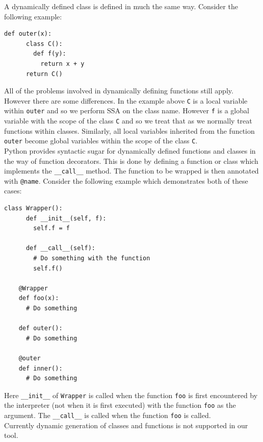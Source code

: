\documentclass[12pt, titlepage]{article}
\begin{document}
\indent A dynamically defined class is defined in much the same way. Consider the following example:
\begin{lstlisting}[mathescape]
    def outer(x):
      class C():
        def f(y):
          return x + y
      return C()
\end{lstlisting}
All of the problems involved in dynamically defining functions still apply. However there are some differences. In the example above \texttt{C} is a local variable within \texttt{outer} and so we perform SSA on the class name. However \texttt{f} is a global variable with the scope of the class \texttt{C} and so we treat that as we normally treat functions within classes. Similarly, all local variables inherited from the function \texttt{outer} become global variables within the scope of the class \texttt{C}. \\
\indent Python provides syntactic sugar for dynamically defined functions and classes in the way of function decorators. This is done by defining a function or class which implements the \texttt{\_\_call\_\_} method. The function to be wrapped is then annotated with \texttt{@name}. Consider the following example which demonstrates both of these cases:
\begin{lstlisting}[mathescape]
    class Wrapper():
      def __init__(self, f):
        self.f = f
        
      def __call__(self):
        # Do something with the function
        self.f()

    @Wrapper
    def foo(x):
      # Do something
      
    def outer():
      # Do something
     
    @outer
    def inner():
      # Do something
\end{lstlisting}
Here \texttt{\_\_init\_\_} of \texttt{Wrapper} is called when the function \texttt{foo} is first encountered by the interpreter (not when it is first executed) with the function \texttt{foo} as the argument. The \texttt{\_\_call\_\_} is called when the function \texttt{foo} is called. \\
\indent Currently dynamic generation of classes and functions is not supported in our tool.
\end{document}
